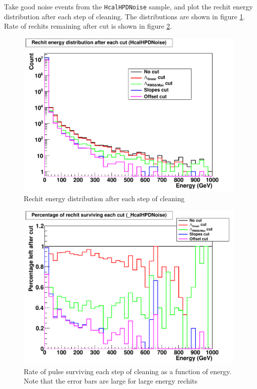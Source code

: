 
Take good noise events from the \texttt{HcalHPDNoise} sample, and plot the rechit energy distribution after each step of cleaning.
The distributions are shown in figure \ref{Figure_6363_RecHitEnergyDistributionCleaning}.
Rate of rechits remaining after cut is shown in figure \ref{Figure_6363_RecHitEnergyDistributionCleaningRatio}.

\begin{figure}
   \includegraphics[width=120mm]{DailyLog/6363/6363_RecHitEnergyComparisonPlot_HcalHPDNoise}
   \caption{Rechit energy distribution after each step of cleaning}
   \label{Figure_6363_RecHitEnergyDistributionCleaning}
\end{figure}

\begin{figure}
   \includegraphics[width=120mm]{DailyLog/6363/6363_RecHitEnergyRatioPlot_HcalHPDNoise}
   \caption{Rate of pulse surviving each step of cleaning as a function of energy.  Note that the error bars are large for large energy rechits}
   \label{Figure_6363_RecHitEnergyDistributionCleaningRatio}
\end{figure}


